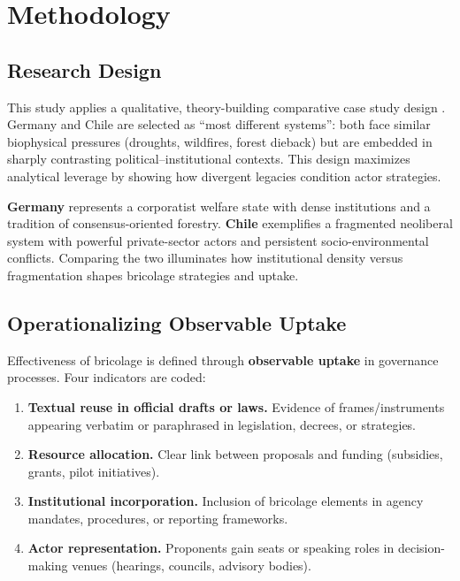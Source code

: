 
\section*{Methodology}

\subsection*{Research Design}
This study applies a qualitative, theory-building comparative case study design 
\parencite{George2005}. Germany and Chile are selected as ``most different systems'': 
both face similar biophysical pressures (droughts, wildfires, forest dieback) but 
are embedded in sharply contrasting political–institutional contexts. This design 
maximizes analytical leverage by showing how divergent legacies condition actor strategies.

\textbf{Germany} represents a corporatist welfare state with dense institutions 
and a tradition of consensus-oriented forestry.  
\textbf{Chile} exemplifies a fragmented neoliberal system with powerful 
private-sector actors and persistent socio-environmental conflicts.  
Comparing the two illuminates how institutional density versus fragmentation 
shapes bricolage strategies and uptake.

\subsection*{Operationalizing Observable Uptake}
Effectiveness of bricolage is defined through \textbf{observable uptake} in governance processes.  
Four indicators are coded:

\begin{enumerate}
    \item \textbf{Textual reuse in official drafts or laws.} Evidence of frames/instruments 
    appearing verbatim or paraphrased in legislation, decrees, or strategies. 
    \item \textbf{Resource allocation.} Clear link between proposals and funding (subsidies, 
    grants, pilot initiatives). 
    \item \textbf{Institutional incorporation.} Inclusion of bricolage elements in agency 
    mandates, procedures, or reporting frameworks. 
    \item \textbf{Actor representation.} Proponents gain seats or speaking roles in 
    decision-making venues (hearings, councils, advisory bodies). 
\end{enumerate}

